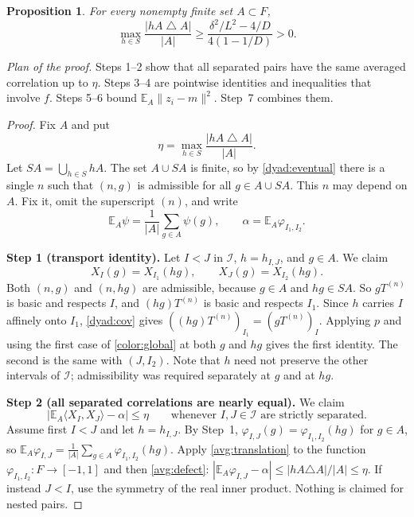 \documentclass[11pt]{article}
\newcommand{\norm}[1]{\lVert #1\rVert}
\newcommand{\ip}[2]{\langle #1,#2\rangle}
\newtheorem{proposition}[theorem]{Proposition}
\theoremstyle{definition}
\numberwithin{equation}{section}
\newcommand{\step}[1]{\par\smallskip\noindent\textbf{Step #1.}\enspace}
\newcommand{\EA}{\mathbb E_A}
\begin{document}
\begin{proposition}\label{avg:boundary}
For every nonempty finite set \(A\subset F\),
\begin{equation}\label{avg:boundary-bound}
  \max_{h\in S}\frac{|hA\mathbin{\triangle}A|}{|A|}
  \ge \frac{\delta^2/L^2-4/D}{4(1-1/D)}>0.
\end{equation}
\end{proposition}

\emph{Plan of the proof.} Steps 1--2 show that all separated pairs have the
same averaged correlation up to \(\eta\). Steps 3--4 are pointwise
identities and inequalities that involve \(f\). Steps 5--6 bound
\(\EA\norm{z_i-m}^2\). Step~7 combines them.

\begin{proof}
Fix \(A\) and put
\begin{equation}\label{avg:defect}
  \eta=\max_{h\in S}\frac{|hA\mathbin{\triangle}A|}{|A|}.
\end{equation}
Let \(SA=\bigcup_{h\in S}hA\). The set \(A\cup SA\) is finite, so by
\cref{dyad:eventual} there is a single \(n\) such that \((n,g)\) is
admissible for all \(g\in A\cup SA\). This \(n\) may depend on \(A\). Fix
it, omit the superscript \((n)\), and write
\[
  \EA\psi=\frac1{|A|}\sum_{g\in A}\psi(g),
  \qquad
  \alpha=\EA\varphi_{I_1,I_2}.
\]

\step{1 (transport identity)}
Let \(I<J\) in \(\mathcal I\), \(h=h_{I,J}\), and \(g\in A\). We claim
\[
  X_I(g)=X_{I_1}(hg),\qquad X_J(g)=X_{I_2}(hg).
\]
Both \((n,g)\) and \((n,hg)\) are admissible, because \(g\in A\) and
\(hg\in SA\). So \(gT^{(n)}\) is basic and respects \(I\), and
\((hg)T^{(n)}\) is basic and respects \(I_1\). Since \(h\) carries \(I\)
affinely onto \(I_1\), \cref{dyad:cov} gives
\(((hg)T^{(n)})_{I_1}=(gT^{(n)})_I\). Applying \(p\) and using the first
case of \eqref{color:global} at both \(g\) and \(hg\) gives the first
identity. The second is the same with \((J,I_2)\).
Note that \(h\) need not preserve the other intervals of \(\mathcal I\);
admissibility was required separately at \(g\) and at \(hg\).

\step{2 (all separated correlations are nearly equal)}
We claim
\begin{equation}\label{avg:correlation}
  \left|\EA\ip{X_I}{X_J}-\alpha\right|\le\eta
  \qquad\text{whenever \(I,J\in\mathcal I\) are strictly separated}.
\end{equation}
Assume first \(I<J\) and let \(h=h_{I,J}\). By Step~1,
\(\varphi_{I,J}(g)=\varphi_{I_1,I_2}(hg)\) for \(g\in A\), so
\(\EA\varphi_{I,J}=\frac1{|A|}\sum_{g\in A}\varphi_{I_1,I_2}(hg)\).
Apply \cref{avg:translation} to the function
\(\varphi_{I_1,I_2}:F\to[-1,1]\) and then \eqref{avg:defect}:
\(|\EA\varphi_{I,J}-\alpha|\le|hA\triangle A|/|A|\le\eta\).
If instead \(J<I\), use the symmetry of the real inner product.
Nothing is claimed for nested pairs.


\end{proof}
\end{document}
